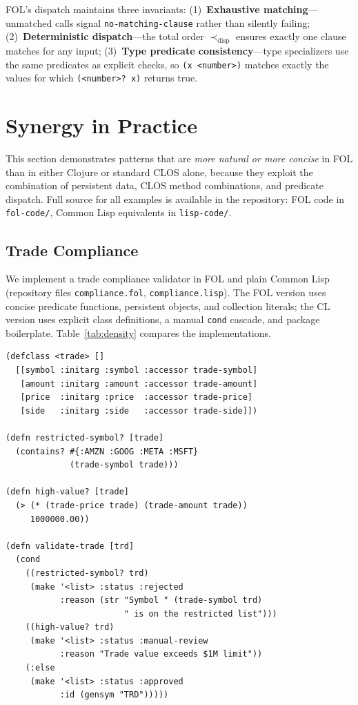 \documentclass[sigconf,nonacm,review]{acmart}
\begin{document}
FOL's dispatch maintains three invariants: (1)~\textbf{Exhaustive matching}---unmatched calls signal \texttt{no-matching-clause} rather than silently failing; (2)~\textbf{Deterministic dispatch}---the total order $\prec_{\text{disp}}$ ensures exactly one clause matches for any input; (3)~\textbf{Type predicate consistency}---type specializers use the same predicates as explicit checks, so \texttt{(x <number>)} matches exactly the values for which \texttt{(<number>? x)} returns true.

\section{Synergy in Practice}

This section demonstrates patterns that are \textit{more natural or more concise} in FOL than in either Clojure or standard CLOS alone, because they exploit the combination of persistent data, CLOS method combinations, and predicate dispatch. Full source for all examples is available in the repository: FOL code in \texttt{fol-code/}, Common Lisp equivalents in \texttt{lisp-code/}.

\subsection{Trade Compliance}

We implement a trade compliance validator in FOL and plain Common Lisp (repository files \texttt{compliance.fol}, \texttt{compliance.lisp}). The FOL version uses concise predicate functions, persistent objects, and collection literals; the CL version uses explicit class definitions, a manual \texttt{cond} cascade, and package boilerplate. Table~\ref{tab:density} compares the implementations.

\begin{lstlisting}
(defclass <trade> []
  [[symbol :initarg :symbol :accessor trade-symbol]
   [amount :initarg :amount :accessor trade-amount]
   [price  :initarg :price  :accessor trade-price]
   [side   :initarg :side   :accessor trade-side]])

(defn restricted-symbol? [trade]
  (contains? #{:AMZN :GOOG :META :MSFT}
             (trade-symbol trade)))

(defn high-value? [trade]
  (> (* (trade-price trade) (trade-amount trade))
     1000000.00))

(defn validate-trade [trd]
  (cond
    ((restricted-symbol? trd)
     (make '<list> :status :rejected
           :reason (str "Symbol " (trade-symbol trd)
                        " is on the restricted list")))
    ((high-value? trd)
     (make '<list> :status :manual-review
           :reason "Trade value exceeds $1M limit"))
    (:else
     (make '<list> :status :approved
           :id (gensym "TRD")))))
\end{lstlisting}
\end{document}
